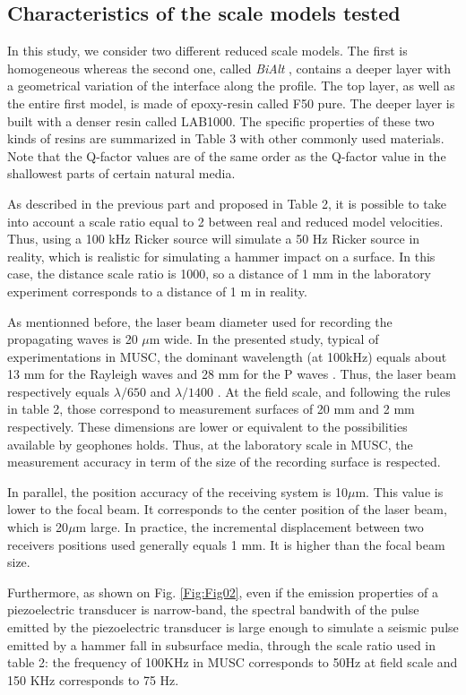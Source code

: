 \documentclass[extra,mreferee]{gji}
\newcommand{\bialt}{\textit{BiAlt} }
\begin{document}
\subsection{Characteristics of the scale models tested}
\label{sec:models}

In this study, we consider two different reduced scale models. The first is homogeneous whereas the second one, called \bialt, contains a deeper layer with a geometrical variation of the interface along the profile. The top layer, as well as the entire first model, is made of epoxy-resin called F50 pure. The deeper layer is built with a denser resin called LAB1000. The specific properties of these two kinds of resins are summarized in Table 3 with other commonly used materials. Note that the Q-factor values are of the same order as the Q-factor value in the shallowest parts of certain natural media.

As described in the previous part and proposed in Table 2, it is possible to take into account a scale ratio equal to 2 between real and reduced model velocities. Thus, using a 100 kHz Ricker source will simulate a 50 Hz Ricker source in reality, which is realistic for simulating a hammer impact on a surface. In this case, the distance scale ratio is 1000, so a distance of 1 mm in the laboratory experiment corresponds to a distance of 1 m in reality. 

As mentionned before, the laser beam diameter used for recording the propagating waves is 20 $\mu$m wide. In the presented study, typical of experimentations in MUSC, the dominant wavelength (at 100kHz) equals about 13 mm for the Rayleigh waves and 28 mm for the P waves . Thus, the laser beam respectively equals  $\lambda /650 $ and $ \lambda /1400 $  . At the field scale, and following the rules in table 2, those correspond to measurement surfaces of 20 mm and 2 mm respectively. These dimensions are lower or equivalent to the possibilities available by geophones holds. Thus, at the laboratory scale in MUSC, the measurement accuracy in term of the size of the recording surface is respected.

In parallel, the position accuracy of the receiving system is 10$\mu$m. This value is lower to the focal beam. It corresponds to the center position of the laser beam, which is 20$\mu $m large. In practice, the incremental displacement between two receivers positions used generally equals 1 mm. It is higher than the focal beam size.

Furthermore, as shown on Fig. \ref{Fig:Fig02}, even if the emission properties of a piezoelectric transducer is narrow-band, the spectral bandwith of the pulse emitted by the piezoelectric transducer is large enough to simulate a seismic pulse emitted by a hammer fall in subsurface media, through the scale ratio used in table 2: the frequency of 100KHz in MUSC corresponds to 50Hz at field scale and 150 KHz corresponds to 75 Hz.
\end{document}

